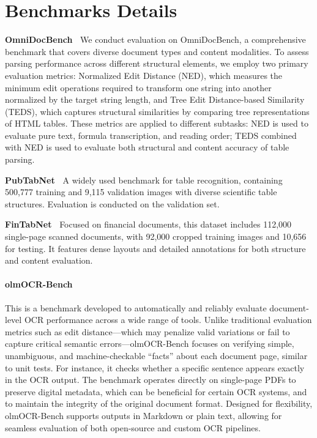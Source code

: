 \section{Benchmarks Details}


\textbf{OmniDocBench~\citep{ouyang2024omnidocbench}} We conduct evaluation on OmniDocBench, a comprehensive benchmark that covers diverse document types and content modalities. To assess parsing performance across different structural elements, we employ two primary evaluation metrics: Normalized Edit Distance (NED), which measures the minimum edit operations required to transform one string into another normalized by the target string length, and Tree Edit Distance-based Similarity (TEDS), which captures structural similarities by comparing tree representations of HTML tables. These metrics are applied to different subtasks: NED is used to evaluate pure text, formula transcription, and reading order; TEDS combined with NED is used to evaluate both structural and content accuracy of table parsing.


\textbf{PubTabNet~\citep{PubTabNet}}
A widely used benchmark for table recognition, containing 500,777 training and 9,115 validation images with diverse scientific table structures. Evaluation is conducted on the validation set.

\textbf{FinTabNet~\citep{zheng2021global}}
Focused on financial documents, this dataset includes 112,000 single-page scanned documents, with 92,000 cropped training images and 10,656 for testing. It features dense layouts and detailed annotations for both structure and content evaluation.

\paragraph{olmOCR-Bench~\citep{poznanski2025olmocr}} This is a benchmark developed to automatically and reliably evaluate document-level OCR performance across a wide range of tools. Unlike traditional evaluation metrics such as edit distance—which may penalize valid variations or fail to capture critical semantic errors—olmOCR-Bench focuses on verifying simple, unambiguous, and machine-checkable “facts” about each document page, similar to unit tests. For instance, it checks whether a specific sentence appears exactly in the OCR output. The benchmark operates directly on single-page PDFs to preserve digital metadata, which can be beneficial for certain OCR systems, and to maintain the integrity of the original document format. Designed for flexibility, olmOCR-Bench supports outputs in Markdown or plain text, allowing for seamless evaluation of both open-source and custom OCR pipelines.


